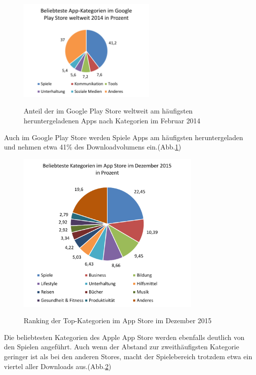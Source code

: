\begin{figure}[htbp]
	\centering
	\includegraphics[width=0.6\textwidth]{Bilder/Google_Play_Store_Kategorien}
	\caption{Anteil der im Google Play Store weltweit am häufigsten heruntergeladenen Apps nach Kategorien im Februar 2014}\label{graph_play_store_kategorien}\citep{play_store_categories}
\end{figure}

Auch im Google Play Store werden Spiele Apps am häufigsten heruntergeladen und nehmen etwa 41\% des Downloadvolumens ein.(Abb.\ref{graph_play_store_kategorien})

\begin{figure}[htbp]
	\centering
	\includegraphics[width=0.8\textwidth]{Bilder/Top_Kategorien_App_Store}
	\caption{Ranking der Top-Kategorien im App Store im Dezember 2015}\label{graph_app_store_kategorien}\citep{app_store_categories}
\end{figure}

Die beliebtesten Kategorien des Apple App Store werden ebenfalls deutlich von den Spielen angeführt. Auch wenn der Abstand zur zweithäufigsten Kategorie geringer ist als bei den anderen Stores, macht der Spielebereich trotzdem etwa ein viertel aller Downloads aus.(Abb.\ref{graph_app_store_kategorien})
\medskip

